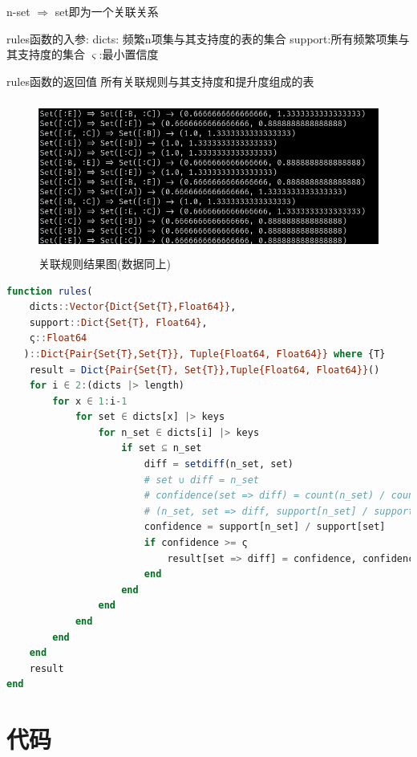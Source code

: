 \documentclass[a4paper]{article}
\begin{document}
n-set $\Longrightarrow$  set即为一个关联关系

rules函数的入参:
dicts: 频繁n项集与其支持度的表的集合
support:所有频繁项集与其支持度的集合
$\varsigma$:最小置信度

rules函数的返回值
所有关联规则与其支持度和提升度组成的表

\begin{figure}[h]
    \centering
    \label{figure:rules}
    \includegraphics[height=5cm]{rules.png}
    \caption{关联规则结果图(数据同上)}
\end{figure}

\begin{lstlisting}[language=julia]
function rules(
    dicts::Vector{Dict{Set{T},Float64}},
    support::Dict{Set{T}, Float64},
    ς::Float64
   )::Dict{Pair{Set{T},Set{T}}, Tuple{Float64, Float64}} where {T}
    result = Dict{Pair{Set{T}, Set{T}},Tuple{Float64, Float64}}()
    for i ∈ 2:(dicts |> length)
        for x ∈ 1:i-1
            for set ∈ dicts[x] |> keys
                for n_set ∈ dicts[i] |> keys
                    if set ⊆ n_set
                        diff = setdiff(n_set, set)
                        # set ∪ diff = n_set
                        # confidence(set => diff) = count(n_set) / count(set)
                        # (n_set, set => diff, support[n_set] / support[set]) |> println
                        confidence = support[n_set] / support[set]
                        if confidence >= ς
                            result[set => diff] = confidence, confidence / support[diff]
                        end
                    end
                end
            end
        end
    end
    result
end

\end{lstlisting}

\newpage

\section{代码} \label {code}
\end{document}

